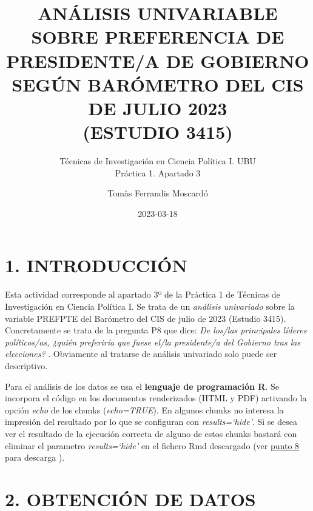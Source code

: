 \documentclass[
  12 pt,
  a4paper,
]{article}
\title{ANÁLISIS UNIVARIABLE SOBRE PREFERENCIA DE PRESIDENTE/A DE
GOBIERNO SEGÚN BARÓMETRO DEL CIS DE JULIO 2023\\
(ESTUDIO 3415)}
\subtitle{Técnicas de Investigación en Ciencia Política I. UBU\\
Práctica 1. Apartado 3}
\author{Tomàs Ferrandis Moscardó}
\date{2023-03-18}
\begin{document}
\maketitle

{
\setcounter{tocdepth}{2}
\tableofcontents
}
\newpage
\renewcommand\tablename{Tabla}

\hypertarget{introducciuxf3n}{%
\section{1. INTRODUCCIÓN}\label{introducciuxf3n}}

Esta actividad corresponde al apartado 3º de la Práctica 1 de Técnicas
de Investigación en Ciencia Política I. Se trata de un \emph{análisis
univariado} sobre la variable PREFPTE del Barómetro del CIS de julio de
2023 (Estudio 3415). Concretamente se trata de la pregunta P8 que dice:
\emph{De los/las principales líderes políticos/as, ¿quién preferiría que
fuese el/la presidente/a del Gobierno tras las elecciones?} . Obviamente
al tratarse de análisis univariado solo puede ser descriptivo.

Para el análisis de los datos se usa el \textbf{lenguaje de programación
R}. Se incorpora el código en los documentos renderizados (HTML y PDF)
activando la opción \emph{echo} de los chunks (\emph{echo=TRUE}). En
algunos chunks no interesa la impresión del resultado por lo que se
configuran con \emph{results=`hide'}. Si se desea ver el resultado de la
ejecución correcta de alguno de estos chunks bastará con eliminar el
parametro \emph{results=`hide'} en el fichero Rmd descargado (ver
\protect\hyperlink{id-github}{punto 8} para descarga ).

\hypertarget{obtenciuxf3n-de-datos}{%
\section{2. OBTENCIÓN DE DATOS}\label{obtenciuxf3n-de-datos}}
\end{document}
